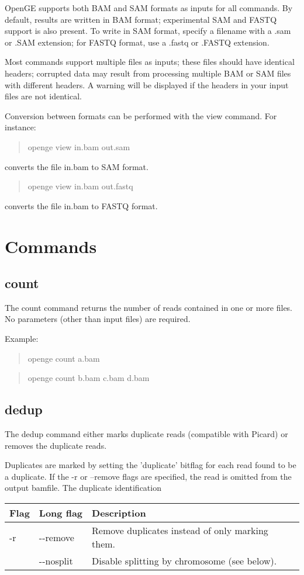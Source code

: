 \documentclass[11pt]{article}
\newcommand {\cmd}[1] {\begin{quote}#1\end{quote}}
\begin{document}
OpenGE supports both BAM and SAM formats as inputs for all commands. By default, results are written in BAM format; experimental SAM and FASTQ support is also present. To write in SAM format, specify a filename with a .sam or .SAM extension; for FASTQ format, use a .fastq or .FASTQ extension.

Most commands support multiple files as inputs; these files should have identical headers; corrupted data may result from processing multiple BAM or SAM files with different headers. A warning will be displayed if the headers in your input files are not identical.

Conversion between formats can be performed with the view command. For instance:
\cmd{openge view in.bam out.sam}
converts the file in.bam to SAM format.

\cmd{openge view in.bam out.fastq}
converts the file in.bam to FASTQ format.

\section {Commands}

\subsection {count}
The count command returns the number of reads contained in one or more files. No parameters (other than input files) are required.

Example:
\cmd{openge count a.bam}
\cmd{openge count b.bam c.bam d.bam}

\subsection {dedup}
The dedup command either marks duplicate reads (compatible with Picard) or removes the duplicate reads. 

Duplicates are marked by setting the 'duplicate' bitflag for each read found to be a duplicate. If the -r or --remove flags are specified, the read is omitted from the output bamfile. The duplicate identification 

\begin{center}
\begin{tabular}{llp{3.5in}}
\hline
Flag&Long flag&Description\\ \hline
-r&{-}{-}remove&Remove duplicates instead of only marking them.\\
&{-}{-}nosplit&Disable splitting by chromosome (see below).\\
\end{tabular}
\end{center}
\end{document}
